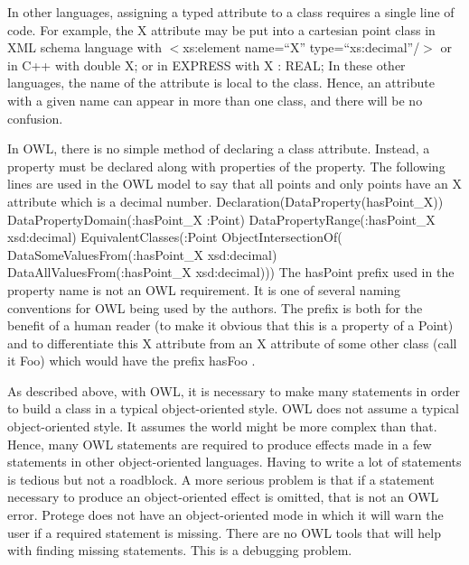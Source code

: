 In other languages, assigning a typed attribute to a class requires a
single line of code. For example, the X attribute may be put into a
cartesian point class in XML schema language with
\newline \sf $<$xs:element name=``X'' type=``xs:decimal''/$>$\rm
\newline or in C++ with
\newline \sf double X; \rm
\newline or in EXPRESS with
\newline \sf X : REAL; \rm \newline
In these other languages, the name of the attribute is local to the class.
Hence, an attribute with a given name can appear in more than one class, and
there will be no confusion.

In OWL, there is no simple method of declaring a class attribute. Instead,
a property must be declared along with properties of the property. The
following lines are used in the OWL model to say that all points and only
points have an X attribute which is a decimal number.
\newline
\newline \sf Declaration(DataProperty(hasPoint\_X))
\newline DataPropertyDomain(:hasPoint\_X :Point)
\newline DataPropertyRange(:hasPoint\_X xsd:decimal)
\newline EquivalentClasses(:Point ObjectIntersectionOf(
\newline \hspace*{0.2in}DataSomeValuesFrom(:hasPoint\_X xsd:decimal)
\newline \hspace*{0.2in}DataAllValuesFrom(:hasPoint\_X xsd:decimal))) \rm
\newline
\newline
The \sf hasPoint \rm prefix used in the property name is not an OWL
requirement. It is one of several naming conventions for OWL being used by
the authors. The prefix is both for the benefit of a human reader (to make
it obvious that this is a property of a Point) and to differentiate this X
attribute from an X attribute of some other class (call it \sf Foo\rm)
which would have the prefix \sf hasFoo \rm.

As described above, with OWL, it is necessary to make many statements in
order to build a class in a typical object-oriented style. OWL does not
assume a typical object-oriented style. It assumes the world might be more
complex than that. Hence, many OWL statements are required to produce
effects made in a few statements in other object-oriented languages. Having
to write a lot of statements is tedious but not a roadblock. A more serious
problem is that if a statement necessary to produce an object-oriented
effect is omitted, that is not an OWL error. Protege does not have an
object-oriented mode in which it will warn the user if a required statement
is missing. There are no OWL tools that will help with finding missing
statements. This is a debugging problem.


